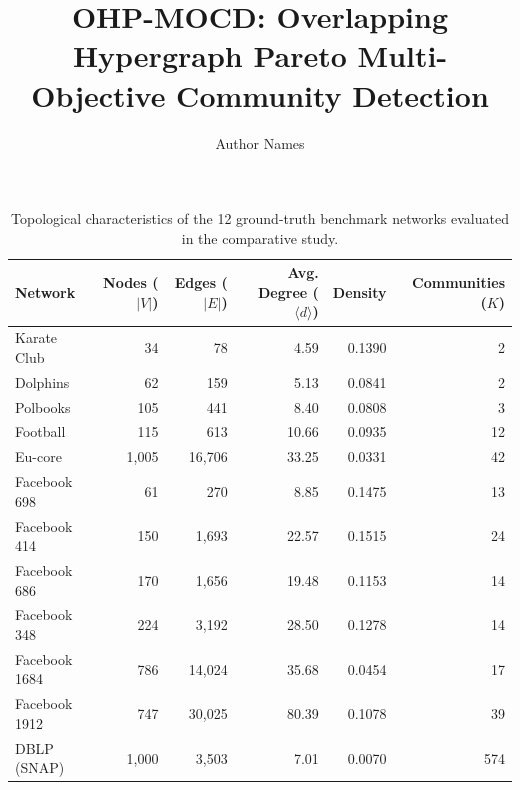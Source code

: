 \documentclass{llncs}
\begin{document}
\title{OHP-MOCD: Overlapping Hypergraph Pareto Multi-Objective Community Detection}
\author{Author Names}
\maketitle

\begin{table}[t]
\centering
\caption{Topological characteristics of the 12 ground-truth benchmark networks evaluated in the comparative study.}
\label{tab:datasets}
\begin{tabular}{@{}lrrrrr@{}}
\toprule
\textbf{Network} & \textbf{Nodes ($|V|$)} & \textbf{Edges ($|E|$)} & \textbf{Avg. Degree ($\langle d \rangle$)} & \textbf{Density} & \textbf{Communities ($K$)} \\
\midrule
Karate Club \cite{zachary1977} & 34 & 78 & 4.59 & 0.1390 & 2 \\
Dolphins \cite{lusseau2003} & 62 & 159 & 5.13 & 0.0841 & 2 \\
Polbooks \cite{newman2006} & 105 & 441 & 8.40 & 0.0808 & 3 \\
Football \cite{girvan2002} & 115 & 613 & 10.66 & 0.0935 & 12 \\
Eu-core \cite{leskovec2007} & 1,005 & 16,706 & 33.25 & 0.0331 & 42 \\
Facebook 698 \cite{leskovec2012} & 61 & 270 & 8.85 & 0.1475 & 13 \\
Facebook 414 \cite{leskovec2012} & 150 & 1,693 & 22.57 & 0.1515 & 24 \\
Facebook 686 \cite{leskovec2012} & 170 & 1,656 & 19.48 & 0.1153 & 14 \\
Facebook 348 \cite{leskovec2012} & 224 & 3,192 & 28.50 & 0.1278 & 14 \\
Facebook 1684 \cite{leskovec2012} & 786 & 14,024 & 35.68 & 0.0454 & 17 \\
Facebook 1912 \cite{leskovec2012} & 747 & 30,025 & 80.39 & 0.1078 & 39 \\
DBLP (SNAP) \cite{yang2015} & 1,000 & 3,503 & 7.01 & 0.0070 & 574 \\
\bottomrule
\end{tabular}
\end{table}
\end{document}
